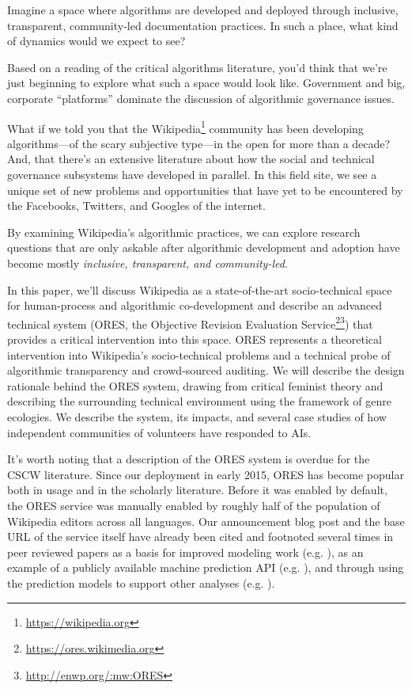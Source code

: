 Imagine a space where algorithms are developed and deployed through inclusive, transparent, community-led documentation practices.  In such a place, what kind of dynamics would we expect to see?

Based on a reading of the critical algorithms literature, you'd think that we're just beginning to explore what such a space would look like.  Government and big, corporate ``platforms'' dominate the discussion of algorithmic governance issues\cite{crawford2016algorithm}\cite{diakopoulos2015algorithmic}\cite{gillespie2014relevance}\cite{tufekci2015algorithms}.

What if we told you that the Wikipedia\footnote{\url{https://wikipedia.org}} community has been developing algorithms---of the scary subjective type---in the open for more than a decade?  And, that there's an extensive literature about how the social and technical governance subsystems have developed in parallel.  In this field site, we see a unique set of new problems and opportunities that have yet to be encountered by the Facebooks, Twitters, and Googles of the internet.

By examining Wikipedia's algorithmic practices, we can explore research questions that are only askable after algorithmic development and adoption have become mostly \emph{inclusive, transparent, and community-led}.

In this paper, we'll discuss Wikipedia as a state-of-the-art socio-technical space for human-process and algorithmic co-development and describe an advanced technical system (ORES, the Objective Revision Evaluation Service\footnote{\url{https://ores.wikimedia.org}}\footnote{\url{http://enwp.org/:mw:ORES}}) that provides a critical intervention into this space.  ORES represents a theoretical intervention into Wikipedia's socio-technical problems and a technical probe of algorithmic transparency and crowd-sourced auditing.  We will describe the design rationale behind the ORES system, drawing from critical feminist theory and describing the surrounding technical environment using the framework of genre ecologies.  We describe the system, its impacts, and several case studies of how independent communities of volunteers have responded to AIs.

It's worth noting that a description of the ORES system is overdue for the CSCW literature.  Since our deployment in early 2015, ORES has become popular both in usage and in the scholarly literature.  Before it was enabled by default, the ORES service was manually enabled by roughly half of the population of Wikipedia editors across all languages.  Our announcement blog post\cite{halfaker2015artificial} and the base URL of the service itself have already been cited and footnoted several times in peer reviewed papers as a basis for improved modeling work (e.g. \cite{dang2016quality}), as an example of a publicly available machine prediction API (e.g. \cite{lewoniewski2017relative}), and through using the prediction models to support other analyses (e.g. \cite{rezguia2017stigmergic}).

